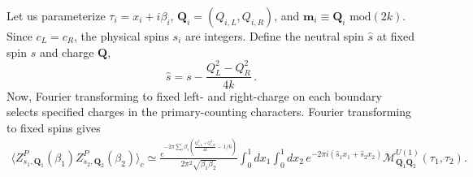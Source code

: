 \documentclass[11pt]{article}
\numberwithin{equation}{section}
\begin{document}
Let us parameterize $\tau_i=x_i+i\beta_i$, $\mathbf Q_i=(Q_{i,L},Q_{i,R})$, and $\mathbf m_i\equiv\mathbf Q_i \text{ mod}(2k)$. Since $c_L=c_R$, the physical spins $s_i$ are integers. Define the neutral spin $\hat{s}$ at fixed spin $s$ and charge $\mathbf{Q}$,
\begin{equation}
 \hat s=s-\frac{Q_{L}^2-Q_{R}^2}{4k}\,.
 \label{eq:sigma_epsilon_U1}
\end{equation}
Now, Fourier transforming to fixed left- and right-charge on each boundary selects specified charges in the primary-counting characters. Fourier transforming to fixed spins gives
\begin{equation}
\begin{aligned}
 \langle Z^P_{s_1,\textbf{Q}_1}(\beta_1)Z^P_{s_2,\textbf{Q}_2}(\beta_2)\rangle_c \simeq \frac{
 e^{-2\pi\sum_i\beta_i\left( \frac{Q_{i,L}^2+Q_{i,R}^2}{4k}-1/6\right)}}
 {2\pi^2\sqrt{\beta_1\beta_2}}
 \int_0^1dx_1\int_0^1dx_2\,
 e^{-2\pi i(\hat s_1x_1+\hat s_2x_2)}
 \mathcal M^{U(1)}_{\mathbf Q_1\mathbf Q_2}(\tau_1,\tau_2).
\end{aligned}
\label{eq:U1-full-sector-correlator}
\end{equation}
\end{document}
